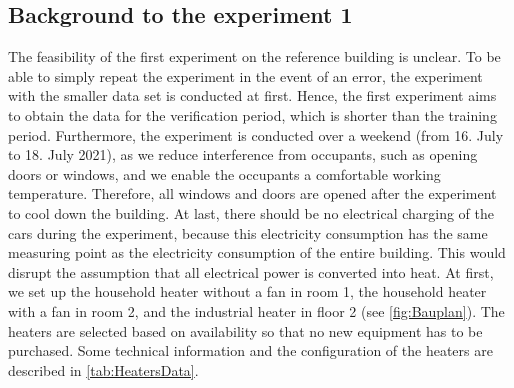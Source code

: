 \subsection{Background to the experiment 1}
\label{subsec:Backgroud to experiment 1}
The feasibility of the first experiment on the reference building is unclear. To be able to simply repeat the experiment in the event of an error, the experiment with the smaller data set is conducted at first. Hence, the first experiment aims to obtain the data for the verification period, which is shorter than the training period. Furthermore, the experiment is conducted over a weekend (from 16. July to 18. July 2021), as we reduce interference from occupants, such as opening doors or windows, and we enable the occupants a comfortable working temperature. Therefore, all windows and doors are opened after the experiment to cool down the building. At last, there should be no electrical charging of the cars during the experiment, because this electricity consumption has the same measuring point as the electricity consumption of the entire building. This would disrupt the assumption that all electrical power is converted into heat.\newline
At first, we set up the household heater without a fan in room 1, the household heater with a fan in room 2, and the industrial heater in floor 2 (see \autoref{fig:Bauplan}). The heaters are selected based on availability so that no new equipment has to be purchased. Some technical information and the configuration of the heaters are described in \autoref{tab:HeatersData}.
